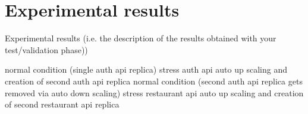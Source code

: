 \section{Experimental results}
Experimental results (i.e. the description of the results obtained with your
test/validation phase))


normal condition (single auth api replica)
stress auth api
auto up scaling and creation of second auth api replica
normal condition (second auth api replica gets removed via auto down scaling)
stress restaurant api
auto up scaling and creation of second restaurant api replica